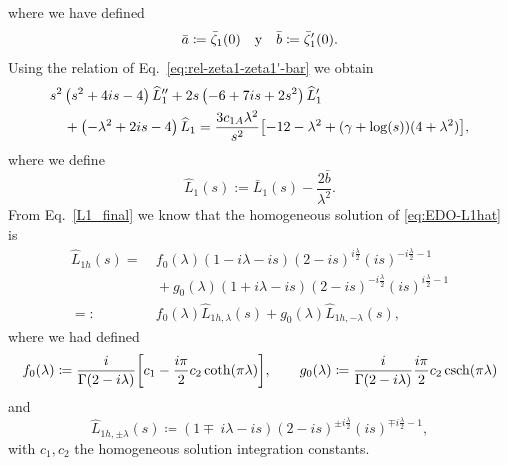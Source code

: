 \documentclass[%
 aip,
 jmp,%
 amsmath,amssymb,
 reprint,%
]{revtex4-2}
\begin{document}
where we have defined
\begin{equation}
    \bar{a} \coloneq \bar{\zeta}_1(0)\quad \textnormal{y}\quad \bar{b} \coloneq \bar{\zeta}_1'(0).
\end{equation}
Using the relation of Eq.~\eqref{eq:rel-zeta1-zeta1'-bar} we obtain
\begin{equation}\label{eq:EDO-L1hat}
\begin{aligned}
& s^2 \left(s^2+4is -4\right){\widehat{L}}_1'' + 2s \left(-6+7is+2s^2\right){\widehat{L}}_1' \\
& \quad + \left(-\lambda^2+2is-4\right){\widehat{L}}_1 = \frac{3c_{1A}\lambda^2}{s^2}\qty[-12 - \lambda^2 + \qty(\gamma + \log(s))(4 + \lambda^2)],
\end{aligned}
\end{equation}
where we define
\begin{equation}
    {\widehat{L}}_1(s) := \bar{L}_1(s) -  \frac{2\bar{b}}{\lambda^2}.
\end{equation}
From Eq.~\eqref{L1_final} we know that the homogeneous solution of \eqref{eq:EDO-L1hat} is
\begin{equation}
\boxed{\begin{aligned}
\widehat L_{1h}(s)= &~{} f_0(\lambda) (1 - i\lambda - i s) (2-i s)^{i\frac{\lambda}{2} } (i s)^{-i\frac{\lambda}{2}-1} \\
&~{} + g_0(\lambda) (1 + i\lambda - i s) (2-i s)^{-i\frac{\lambda}{2} } (i s)^{i\frac{\lambda}{2}-1} \\
= : &~{} f_0(\lambda) \widehat L_{1h,\lambda}(s) +  g_0(\lambda) \widehat L_{1h,-\lambda}(s),
\end{aligned}}
\end{equation}
where we had defined
\begin{equation}
    f_0(\lambda) \coloneq \frac{i}{\Gamma(2 - i\lambda)}\qty[c_1 - \frac{i\pi}{2}c_2\coth(\pi\lambda)],\qquad g_0(\lambda) \coloneq \frac{i}{\Gamma(2 - i\lambda)}\frac{i\pi}{2}c_2\csch(\pi\lambda)
\end{equation}
and
\begin{equation}
    \widehat{L}_{1h,\pm\lambda}(s) \coloneq (1 \mp\ i\lambda - i s) (2 - i s)^{\pm i\frac{\lambda}{2} } (i s)^{\mp i\frac{\lambda}{2}-1},
\end{equation}
with $c_1,c_2$ the homogeneous solution integration constants.
\end{document}
